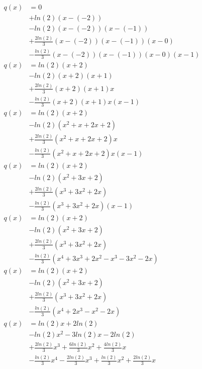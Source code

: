 \documentclass[12pt, letterpaper]{article}
\begin{document}
\begin{enumerate}
  \begin{equation*}
    \begin{split}
      q(x) & = 0 \\
      & + ln(2) (x - (-2)) \\
      & - ln(2) (x - (-2)) (x - (-1)) \\
      & + \frac{2ln(2)}{3} (x - (-2)) (x - (-1)) (x - 0) \\
      & - \frac{ln(2)}{3} (x - (-2)) (x - (-1)) (x - 0) (x - 1) \\
      q(x) & = ln(2) (x + 2) \\
      & - ln(2) (x + 2) (x + 1) \\
      & + \frac{2ln(2)}{3} (x + 2) (x + 1) x \\
      & - \frac{ln(2)}{3} (x + 2) (x + 1) x (x - 1) \\
      q(x) & = ln(2) (x + 2) \\
      & - ln(2) (x^2 + x + 2x + 2) \\
      & + \frac{2ln(2)}{3} (x^2 + x + 2x + 2) x \\
      & - \frac{ln(2)}{3} (x^2 + x + 2x + 2) x (x - 1) \\
      q(x) & = ln(2) (x + 2) \\
      & - ln(2) (x^2 + 3x + 2) \\
      & + \frac{2ln(2)}{3} (x^3 + 3x^2 + 2x) \\
      & - \frac{ln(2)}{3} (x^3 + 3x^2 + 2x) (x - 1) \\
      q(x) & = ln(2) (x + 2) \\
      & - ln(2) (x^2 + 3x + 2) \\
      & + \frac{2ln(2)}{3} (x^3 + 3x^2 + 2x) \\
      & - \frac{ln(2)}{3} (x^4 + 3x^3 + 2x^2 - x^3 - 3x^2 - 2x) \\
      q(x) & = ln(2) (x + 2) \\
      & - ln(2) (x^2 + 3x + 2) \\
      & + \frac{2ln(2)}{3} (x^3 + 3x^2 + 2x) \\
      & - \frac{ln(2)}{3} (x^4 + 2x^3 - x^2 - 2x) \\
      q(x) & = ln(2)x + 2ln(2) \\
      & - ln(2)x^2 - 3ln(2)x - 2ln(2) \\
      & + \frac{2ln(2)}{3}x^3 + \frac{6ln(2)}{3}x^2 + \frac{4ln(2)}{3}x \\
      & - \frac{ln(2)}{3}x^4 - \frac{2ln(2)}{3}x^3 + \frac{ln(2)}{3}x^2 + \frac{2ln(2)}{3}x \\
    \end{split}
  \end{equation*}


\end{enumerate}
\end{document}
